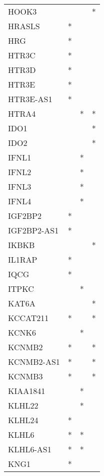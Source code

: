 \begin{longtable}{lccc}
HOOK3            &       &    &       * \\
HRASLS           &     * &    &         \\
HRG              &     * &    &         \\
HTR3C            &     * &    &         \\
HTR3D            &     * &    &         \\
HTR3E            &     * &    &         \\
HTR3E-AS1        &     * &    &         \\
HTRA4            &       &  * &       * \\
IDO1             &       &    &       * \\
IDO2             &       &    &       * \\
IFNL1            &       &  * &         \\
IFNL2            &       &  * &         \\
IFNL3            &       &  * &         \\
IFNL4            &       &  * &         \\
IGF2BP2          &     * &    &         \\
IGF2BP2-AS1      &     * &    &         \\
IKBKB            &       &    &       * \\
IL1RAP           &     * &    &         \\
IQCG             &     * &    &         \\
ITPKC            &       &  * &         \\
KAT6A            &       &    &       * \\
KCCAT211         &     * &    &       * \\
KCNK6            &       &  * &         \\
KCNMB2           &     * &    &       * \\
KCNMB2-AS1       &     * &    &       * \\
KCNMB3           &     * &    &       * \\
KIAA1841         &       &  * &         \\
KLHL22           &       &  * &         \\
KLHL24           &     * &    &         \\
KLHL6            &     * &  * &         \\
KLHL6-AS1        &     * &  * &         \\
KNG1             &     * &    &         \\

\end{longtable}

